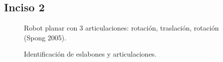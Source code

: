 \documentclass[a4paper,12pt]{article}
\begin{document}
\subsection{Inciso 2}
\label{subsec: robot 2}

\begin{figure}[H]
    \centering
    \begin{adjustbox}{scale = 0.5, max width=\columnwidth}
    \end{adjustbox}
    \caption{Robot planar con 3 articulaciones: rotación, traslación, rotación (Spong 2005).}
\end{figure}

\begin{figure}[H]
    \centering
    \begin{adjustbox}{scale = 0.5, max width=\columnwidth}
    \end{adjustbox}
    \caption{Identificación de eslabones y articulaciones.}
\end{figure}
\end{document}
